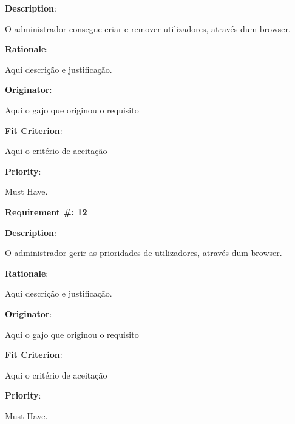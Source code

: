 \begin{description}
\item \textbf{Description}:

O administrador consegue criar e remover utilizadores, através dum browser.


\item \textbf{Rationale}:

Aqui descrição e justificação. \\
\item \textbf{Originator}:

Aqui o gajo que originou o requisito\\

\item \textbf{Fit Criterion}:

Aqui o critério de aceitação \\

\item \textbf{Priority}:

Must Have. \\

\end{description}

\pagebreak






\begin{minipage}{0.55\textwidth}
\begin{flushleft}\textbf{Requirement \#: 12}\end{flushleft}
\end{minipage}
\begin{minipage}{0.4\textwidth}
\end{minipage}

\begin{description}
\item \textbf{Description}:

O administrador gerir as prioridades de utilizadores, através dum browser.


\item \textbf{Rationale}:

Aqui descrição e justificação. \\
\item \textbf{Originator}:

Aqui o gajo que originou o requisito\\

\item \textbf{Fit Criterion}:

Aqui o critério de aceitação \\

\item \textbf{Priority}:

Must Have. \\

\end{description}

\pagebreak



